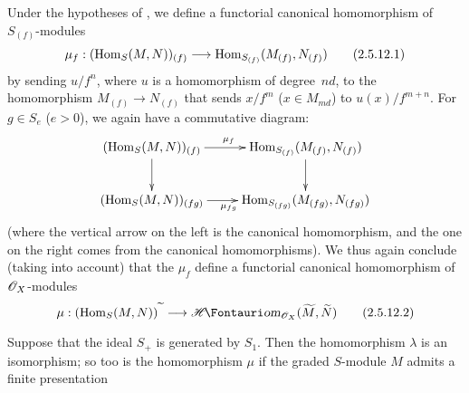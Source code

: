 \begin{env}[2.5.12]
\label{II.2.5.12}
Under the hypotheses of , we define a functorial canonical homomorphism of $S_{(f)}$-modules
\[
\label{II.2.5.12.1}
  \mu_f: (\Hom_S(M,N))_{(f)} \to \Hom_{S_{(f)}}(M_{(f)},N_{(f)})
\tag{2.5.12.1}
\]
by sending $u/f^n$, where $u$ is a homomorphism of degree~$nd$, to the homomorphism $M_{(f)}\to N_{(f)}$ that sends $x/f^m$ ($x\in M_{md}$) to $u(x)/f^{m+n}$.
For $g\in S_e$ ($e>0$), we again have a commutative diagram:
\[
  \xymatrix{
    (\Hom_S(M,N))_{(f)} \ar[r]^{\mu_f} \ar[d]
    & \Hom_{S_{(f)}}(M_{(f)},N_{(f)}) \ar[d]
  \\(\Hom_S(M,N))_{(fg)} \ar[r]_{\mu_{fg}}
    & \Hom_{S_{(fg)}}(M_{(fg)},N_{(fg)})
  }
\]
(where the vertical arrow on the left is the canonical homomorphism, and the one on the right comes from the canonical homomorphisms).
We thus again conclude (taking  into account) that the $\mu_f$ define a functorial canonical homomorphism of $\mathscr{O}_X$-modules
\[
\label{II.2.5.12.2}
  \mu: (\Hom_S(M,N))^\supertilde \to \shHom_{\sh{O}_X}(\widetilde{M},\widetilde{N})
\tag{2.5.12.2}
\]
\end{env}

\begin{proposition}[2.5.13]
\label{II.2.5.13}
Suppose that the ideal $S_+$ is generated by $S_1$.
Then the homomorphism $\lambda$  is an isomorphism;
so too is the homomorphism $\mu$  if the graded $S$-module $M$ admits a finite presentation 
\end{proposition}

